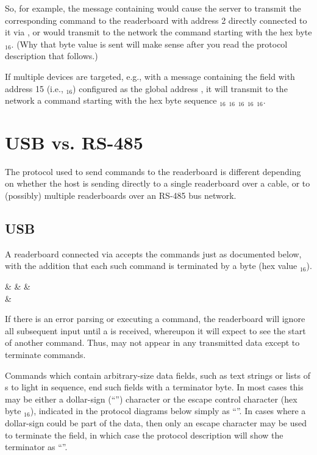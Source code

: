 So, for example, the message containing  would cause the server to transmit the corresponding command to the readerboard with address 2 directly connected to it via , or
would transmit to the  network the command starting with the hex byte $_{16}$. (Why that byte value is sent will make sense after you read the protocol
description that follows.)

If multiple devices are targeted, e.g., with a message containing the field  with address 15 (i.e., $_{16}$) configured as the global address ,
it will transmit to the  network a command starting with the hex byte sequence $_{16}$ $_{16}$ $_{16}$ $_{16}$ $_{16}$.
\section{USB vs. RS-485}
The protocol used to send commands to the readerboard is different depending on
whether the host is sending directly to a single readerboard over a 
cable, or to (possibly) multiple readerboards over an RS-485 bus network.

\subsection{USB}
A readerboard connected via  accepts the commands just as documented
below, with the addition that each such command is terminated by a 
 byte (hex value $_{16}$).
\begin{center}
\begin{bytefield}[endianness=little,bitwidth=0.11111\textwidth]{9}
	&
	&
	&
	\\
	&
\end{bytefield}
\end{center}

If there is an error parsing or executing a command, the readerboard will ignore
all subsequent input until a  is received, whereupon it will
expect to see the start of another command. Thus,  may not
appear in any transmitted data except to terminate commands.

Commands which contain arbitrary-size data fields, such as text strings or lists of
s to light in sequence, end such fields with a terminator byte. In most cases
this may be
either a dollar-sign (``\z{\$}'') character or the
escape control character (hex byte $_{16}$), indicated in the protocol diagrams below
simply as ``\z{\$}''. In cases where a dollar-sign could be part of the data, then
only an escape character may be used to terminate the field, in which case the protocol
description will show the terminator as ``''.

